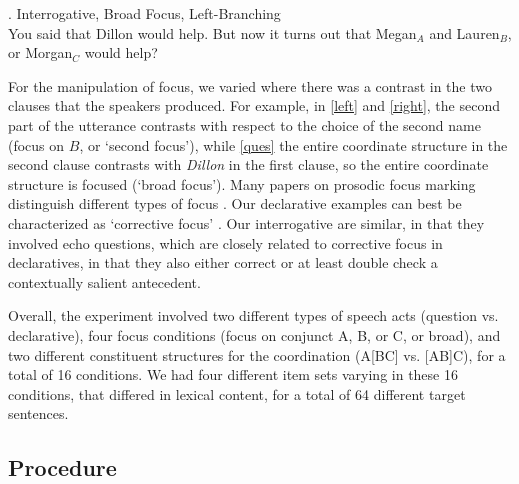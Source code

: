 \documentclass[preprint,review,12pt,authoryear,times]{elsarticle}
\begin{document}
 \ex. Interrogative, Broad Focus, Left-Branching\\
 {\footnotesize You said that Dillon would help. But now it turns out that Megan$_A$ and Lauren$_B$, or Morgan$_C$ would help?}\label{ques}
 
For the manipulation of focus, we varied where there was a contrast in the two clauses that the speakers produced.  For example, in \ref{left} and \ref{right}, the second part of the utterance contrasts with respect to the choice of the second name (focus on $B$, or `second focus'), while \ref{ques} the entire coordinate structure in the second clause contrasts with {\em Dillon} in the first clause, so the entire coordinate structure is focused (`broad focus'). Many papers on prosodic focus marking distinguish different types of focus \citep[e.g.][]{gusse07}. Our declarative examples can best be characterized as `corrective focus' \citep[cf.][]{ladd08, vanderkloketal18}. Our interrogative are similar, in that they involved echo questions, which are closely related to corrective focus in declaratives, in that they also either correct or at least double check a contextually salient antecedent.

Overall, the experiment involved two different types of speech acts (question vs. declarative), four focus conditions (focus on conjunct A, B, or C, or  broad), and two different constituent structures for the coordination (A[BC] vs. [AB]C), for a total of 16 conditions. We had four different item sets varying in these 16 conditions, that differed in lexical content, for a total of 64 different target sentences.


\subsection{Procedure}
\end{document}
